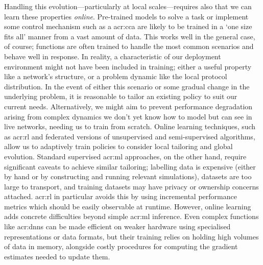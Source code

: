 Handling this evolution---particularly at local scales---requires also that we can learn these properties \emph{online}.
Pre-trained models to solve a task or implement some control mechanism such as a \gls{acr:cca} are likely to be trained in a `one size fits all' manner from a vast amount of data.
This works well in the general case, of course; functions are often trained to handle the most common scenarios and behave well in response.
In reality, a characteristic of our deployment environment might not have been included in training; either a useful property like a network's structure, or a problem dynamic like the local protocol distribution.
In the event of either this scenario or some gradual change in the underlying problem, it is reasonable to tailor an existing policy to suit our current needs.
Alternatively, we might aim to prevent performance degradation arising from complex dynamics we don't yet know how to model but can see in live networks, needing us to train from scratch.
Online learning techniques, such as \gls{acr:rl} and federated versions of unsupervised and semi-supervised algorithms, allow us to adaptively train policies to consider local tailoring and global evolution.
Standard supervised \gls{acr:ml} approaches, on the other hand, require significant caveats to achieve similar tailoring; labelling data is expensive (either by hand or by constructing and running relevant simulations), datasets are too large to transport, and training datasets may have privacy or ownership concerns attached.
\gls{acr:rl} in particular avoids this by using incremental performance metrics which should be easily observable at runtime.
However, online learning adds concrete difficulties beyond simple \gls{acr:ml} inference.
Even complex functions like \glspl{acr:dnn} can be made efficient on weaker hardware using specialised representations or data formats, but their training relies on holding high volumes of data in memory, alongside costly procedures for computing the gradient estimates needed to update them.
 
%

